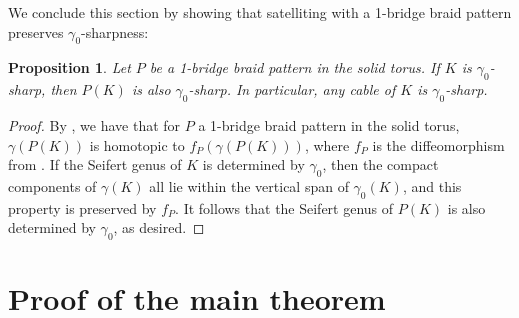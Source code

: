 \documentclass[11pt, reqno]{amsart}
\newtheorem{proposition}[theorem]{Proposition}
\theoremstyle{definition}
\theoremstyle{remark}
\numberwithin{equation}{section}
\begin{document}




We conclude this section by showing that satelliting with a 1-bridge braid pattern preserves $\gamma_0$-sharpness:

\begin{proposition}\label{prop:preservedcabling}
Let $P$ be a 1-bridge braid pattern in the solid torus.  
If $K$ is $\gamma_0$-sharp, then $P(K)$ is also $\gamma_0$-sharp.  
In particular, any cable of $K$ is $\gamma_0$-sharp.
\end{proposition}


\begin{proof}
By \cite[Theorem 1.3]{ChenHanselman}, we have that for $P$ a 1-bridge braid pattern in the solid torus, $\gamma(P(K))$ is homotopic to $f_P(\gamma(P(K)))$, where $f_P$ is the diffeomorphism from \cite[Section 6.4]{ChenHanselman}. If the Seifert genus of $K$ is determined by $\gamma_0$, then the compact components of $\gamma(K)$ all lie within the vertical span of $\gamma_0(K)$, and this property is preserved by $f_P$. It follows that the Seifert genus of $P(K)$ is also determined by $\gamma_0$, as desired.
\end{proof}






\section{Proof of the main theorem}\label{sec:mainthm}
\end{document}
